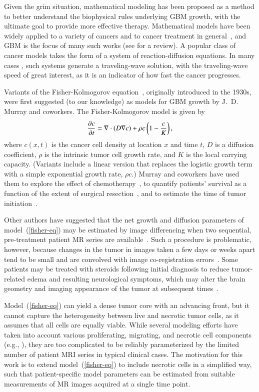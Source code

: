 \documentclass{aims}
\numberwithin{equation}{section}
\begin{document}
Given the grim situation, mathematical modeling has been proposed as a
method to better understand the biophysical rules underlying GBM growth,
with the ultimate goal to provide more effective therapy.  Mathematical
models have been widely applied to a variety of cancers and to cancer
treatment in general~\cite{Kuang}, and GBM is the focus of many such works
(see \cite{Martirosyan2015} for a review).  A popular class of cancer models
takes the form of a system of reaction-diffusion equations. In many cases
\cite{Harley2014,Gerlee2016,Stepien2018}, such systems generate a traveling-wave
solution, with the traveling-wave speed of great interest, as it is an
indicator of how fast the cancer progresses.

Variants of the Fisher-Kolmogorov equation~\cite{Fisher1937}, originally introduced
in the 1930s, were first suggested (to our knowledge)
as models for GBM growth by J.~D. Murray and coworkers.
The Fisher-Kolmogorov model is given by
\begin{equation}
\frac{\partial c}{\partial t} = \nabla\cdot\left(D \nabla{c}\right) + \rho c \left(1 - \frac{c}{K}\right),
\label{fisher-eq}
\end{equation}
where $c(x,t)$ is the cancer cell density at location $x$ and time $t$, $D$
is a diffusion coefficient, $\rho$ is the intrinsic tumor cell growth rate,
and $K$ is the local carrying capacity.  (Variants include a linear version
that replaces the logistic growth term with a simple exponential growth
rate, $\rho c$.)  Murray and coworkers have used them to explore the effect of
chemotherapy~\cite{Tracqui1995}, to quantify patients' survival as a function
of the extent of surgical resection~\cite{Woodward1996},
and to estimate the time of tumor initiation~\cite{Murray2012}.

Other authors have suggested that the net growth and diffusion parameters
of model~(\ref{fisher-eq}) may be estimated by image differencing when
two sequential, pre-treatment patient MR series are
available~\cite{Swanson2008,Neal2013,Jackson2015a}.
Such a procedure is problematic, however, because changes in
the tumor in images taken a few days or weeks apart tend to be small
and are convolved with image co-registration errors~\cite{vanderHorn2016}.
Some patients may be treated with
steroids following initial diagnosis to reduce tumor-related edema and
resulting neurological symptoms,
which may alter the brain geometry and imaging appearance of the
tumor at subsequent times~\cite{Watling1994,Zaki2004}.

Model~(\ref{fisher-eq}) can yield a dense tumor
core with an advancing front, but it cannot capture the heterogeneity between
live and necrotic tumor cells, as it assumes that all cells are equally
viable.  While several modeling efforts have taken into account various
proliferating, migrating, and necrotic cell components (e.g.,
\cite{Eikenberry2009,Swanson2011}), they are too complicated to be reliably
parameterized by the limited number of patient MRI series in typical
clinical cases.  The motivation for this work is to extend model~(\ref{fisher-eq})
to include necrotic cells in a simplified way, such that
patient-specific model parameters can be estimated from suitable measurements of MR
images acquired at a single time point.
\end{document}
